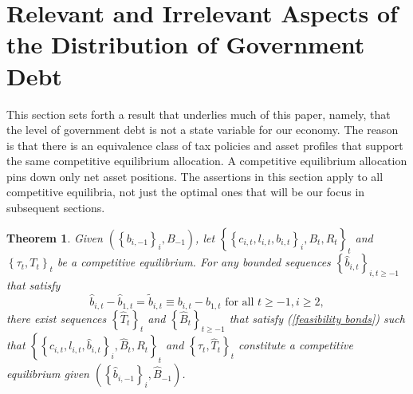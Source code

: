 \documentclass[thmsb,11pt]{article}
\newtheorem{theorem}{Theorem}
\begin{document}
\section{\protect\smallskip Relevant and Irrelevant Aspects of  the Distribution of Government Debt\label{sec:Ricardian101}}
%
This section sets forth  a  result that underlies much of this paper, namely, that  the level
of government debt is not a state variable for our economy.  The reason is that there is an equivalence class of tax policies and asset profiles that support the same competitive equilibrium allocation.
A competitive  equilibrium allocation pins down only net asset  positions.
The assertions in this section apply to all competitive equilibria, not just the optimal ones that will be our focus in subsequent sections.


\begin{theorem}
\label{theorem: main} Given $\left( \left \{ b_{i,-1}\right \}
_{i},B_{-1}\right) $, let $\left \{ \left \{ c_{i,t},l_{i,t},b_{i,t}\right \} _{i},B_{t},R_{t}\right \} _{t} $ and $\left \{ \tau _{t},T_{t}\right
\} _{t}$ be a competitive equilibrium. For any bounded sequences $%
\left \{ \hat{b}_{i,t}\right \} _{i,t\geq -1}$ that satisfy
\begin{equation*}
\hat{b}_{i,t}-\hat{b}_{1,t}=\tilde{b}_{i,t}\equiv b_{i,t}	-b_{1,t}\text{ for all }t\geq -1,i\geq 2,
\end{equation*}%
there exist  sequences $\left \{ \hat{T}_{t}\right \} _{t}$ and $%
\left \{ \hat{B}_{t}\right \} _{t\geq -1}$ that satisfy (\ref{feasibility
bonds}) such that $\left \{ \left \{ c_{i,t},l_{i,t},\hat{b}%
_{i,t}\right \} _{i},\hat{B}_{t},R_{t}\right \} _{t}$ and $\left \{
\tau _{t},\hat{T}_{t}\right \} _{t}$ constitute a competitive
equilibrium given $\left( \left \{ \hat{b}_{i,-1}\right \} _{i},\hat{B}%
_{-1}\right) $.
\end{theorem}
\end{document}
